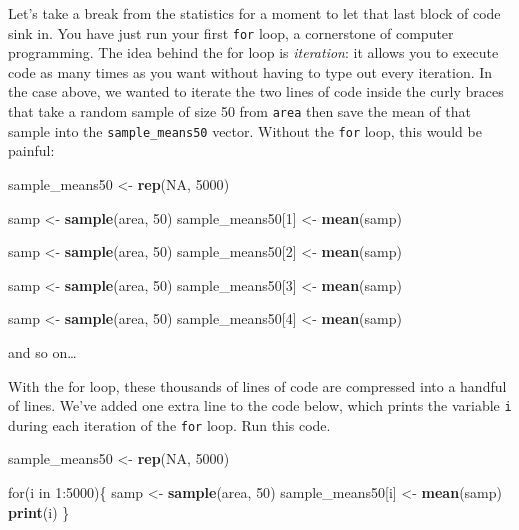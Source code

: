 \documentclass[]{book}
\newenvironment{Shaded}{\begin{snugshade}}{\end{snugshade}}
\newcommand{\KeywordTok}[1]{\textcolor[rgb]{0.13,0.29,0.53}{\textbf{{#1}}}}
\newcommand{\DecValTok}[1]{\textcolor[rgb]{0.00,0.00,0.81}{{#1}}}
\newcommand{\StringTok}[1]{\textcolor[rgb]{0.31,0.60,0.02}{{#1}}}
\newcommand{\OtherTok}[1]{\textcolor[rgb]{0.56,0.35,0.01}{{#1}}}
\newcommand{\NormalTok}[1]{{#1}}
\theoremstyle{definition}
\theoremstyle{definition}
\theoremstyle{definition}
\theoremstyle{remark}
\begin{document}
Let's take a break from the statistics for a moment to let that last
block of code sink in. You have just run your first \texttt{for} loop, a
cornerstone of computer programming. The idea behind the for loop is
\emph{iteration}: it allows you to execute code as many times as you
want without having to type out every iteration. In the case above, we
wanted to iterate the two lines of code inside the curly braces that
take a random sample of size 50 from \texttt{area} then save the mean of
that sample into the \texttt{sample\_means50} vector. Without the
\texttt{for} loop, this would be painful:

\begin{Shaded}
\begin{Highlighting}[]
\NormalTok{sample_means50 <-}\StringTok{ }\KeywordTok{rep}\NormalTok{(}\OtherTok{NA}\NormalTok{, }\DecValTok{5000}\NormalTok{)}

\NormalTok{samp <-}\StringTok{ }\KeywordTok{sample}\NormalTok{(area, }\DecValTok{50}\NormalTok{)}
\NormalTok{sample_means50[}\DecValTok{1}\NormalTok{] <-}\StringTok{ }\KeywordTok{mean}\NormalTok{(samp)}

\NormalTok{samp <-}\StringTok{ }\KeywordTok{sample}\NormalTok{(area, }\DecValTok{50}\NormalTok{)}
\NormalTok{sample_means50[}\DecValTok{2}\NormalTok{] <-}\StringTok{ }\KeywordTok{mean}\NormalTok{(samp)}

\NormalTok{samp <-}\StringTok{ }\KeywordTok{sample}\NormalTok{(area, }\DecValTok{50}\NormalTok{)}
\NormalTok{sample_means50[}\DecValTok{3}\NormalTok{] <-}\StringTok{ }\KeywordTok{mean}\NormalTok{(samp)}

\NormalTok{samp <-}\StringTok{ }\KeywordTok{sample}\NormalTok{(area, }\DecValTok{50}\NormalTok{)}
\NormalTok{sample_means50[}\DecValTok{4}\NormalTok{] <-}\StringTok{ }\KeywordTok{mean}\NormalTok{(samp)}
\end{Highlighting}
\end{Shaded}

and so on\ldots{}

With the for loop, these thousands of lines of code are compressed into
a handful of lines. We've added one extra line to the code below, which
prints the variable \texttt{i} during each iteration of the \texttt{for}
loop. Run this code.

\begin{Shaded}
\begin{Highlighting}[]
\NormalTok{sample_means50 <-}\StringTok{ }\KeywordTok{rep}\NormalTok{(}\OtherTok{NA}\NormalTok{, }\DecValTok{5000}\NormalTok{)}

\NormalTok{for(i in }\DecValTok{1}\NormalTok{:}\DecValTok{5000}\NormalTok{)\{}
   \NormalTok{samp <-}\StringTok{ }\KeywordTok{sample}\NormalTok{(area, }\DecValTok{50}\NormalTok{)}
   \NormalTok{sample_means50[i] <-}\StringTok{ }\KeywordTok{mean}\NormalTok{(samp)}
   \KeywordTok{print}\NormalTok{(i)}
   \NormalTok{\}}
\end{Highlighting}
\end{Shaded}
\end{document}
